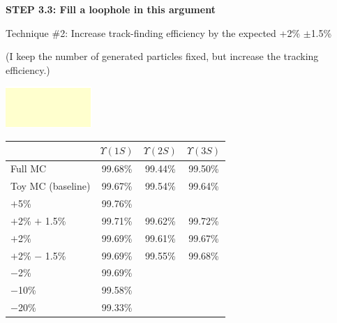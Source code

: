 \documentclass[landscape]{article}
\begin{document}
\vfill

\pagebreak

\vspace{1 cm}

{\bf STEP 3.3: Fill a loophole in this argument}

\vfill

Technique \#2:  Increase track-finding efficiency by the expected +2\% $\pm$1.5\%

\vfill

(I keep the number of generated particles fixed, but increase the tracking efficiency.)

\vfill

\vspace{4.5 cm}
\includegraphics[width=\linewidth, height=3.4 cm]{yellow.pdf}
\vspace{-4.5 cm}
\vspace{-0.4 cm}
\vspace{-4.05 cm}

\begin{center}
  \renewcommand{\arraystretch}{1.25}
  \begin{tabular}{p{12 cm} c c c}
  & \mbox{\hspace{0.5 cm}} $\Upsilon(1S)$ \mbox{\hspace{0.5 cm}} & \mbox{\hspace{0.5 cm}} $\Upsilon(2S)$ \mbox{\hspace{0.5 cm}} & \mbox{\hspace{0.5 cm}} $\Upsilon(3S)$ \mbox{\hspace{0.5 cm}} \\\hline
  Full MC           & 99.68\% & 99.44\% & 99.50\% \\
  Toy MC (baseline) & 99.67\% & 99.54\% & 99.64\% \\
  $+$5\%            & 99.76\% & & \\
  $+$2\% $+$ 1.5\%  & 99.71\% & 99.62\% & 99.72\% \\
  $+$2\%            & 99.69\% & 99.61\% & 99.67\% \\
  $+$2\% $-$ 1.5\%  & 99.69\% & 99.55\% & 99.68\% \\
  $-$2\%            & 99.69\% & & \\
  $-$10\%           & 99.58\% & & \\
  $-$20\%           & 99.33\% & & \\
  \end{tabular}
\end{center}
\end{document}
